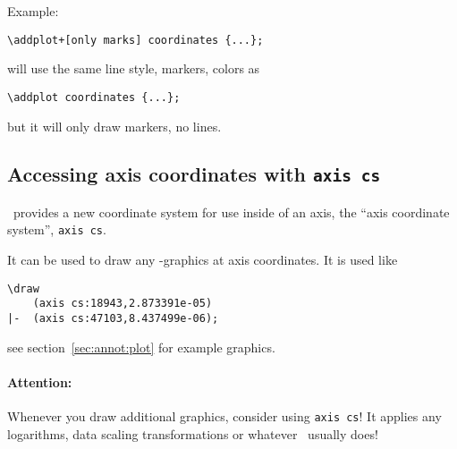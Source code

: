 Example:
\begin{lstlisting}
\addplot+[only marks] coordinates {...};
\end{lstlisting}
will use the same line style, markers, colors as
\begin{lstlisting}
\addplot coordinates {...};
\end{lstlisting}
but it will only draw markers, no lines.

\subsection{Accessing axis coordinates with \texttt{axis cs}}
\label{sec:axis:coords}%
\PGFPlots\ provides a new coordinate system for use inside of an axis, the ``axis coordinate system'', \texttt{axis cs}.

It can be used to draw any \Tikz-graphics at axis coordinates. It is used like
\begin{lstlisting}
\draw 
	(axis cs:18943,2.873391e-05) 
|-	(axis cs:47103,8.437499e-06);
\end{lstlisting}
see section~\ref{sec:annot:plot} for example graphics.

\paragraph{Attention:} Whenever you draw additional graphics, consider using \texttt{axis cs}! It applies any logarithms, data scaling transformations or whatever \PGFPlots\ usually does!

